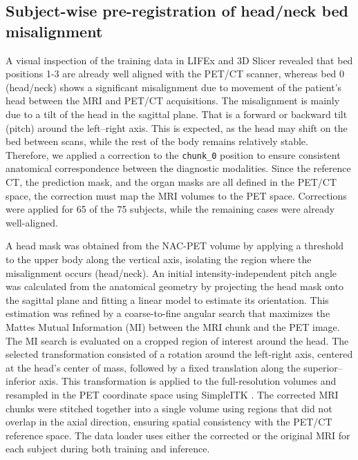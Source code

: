 \documentclass{article}
\begin{document}
\subsection{Subject-wise pre-registration of head/neck bed misalignment}

A visual inspection of the training data in LIFEx \cite{nioche2018lifex} and 3D Slicer \cite{fedorov20123d} revealed that bed positions 1-3 are already well aligned with the PET/CT scanner, whereas bed 0 (head/neck) shows a significant misalignment due to movement of the patient's head between the MRI and PET/CT acquisitions. 
The misalignment is mainly due to a tilt of the head in the sagittal plane. That is a forward or backward tilt (pitch) around the left–right axis. This is expected, as the head may shift on the bed between scans, while the rest of the body remains relatively stable.
Therefore, we applied a correction to the \texttt{chunk\_0} position to ensure consistent anatomical correspondence between the diagnostic modalities.
Since the reference CT, the prediction mask, and the organ masks are all defined in the PET/CT space, the correction must map the MRI volumes to the PET space. 
Corrections were applied for 65 of the 75 subjects, while the remaining cases were already well-aligned. 

A head mask was obtained from the NAC-PET volume by applying a threshold to the upper body along the vertical axis, isolating the region where the misalignment occurs (head/neck). An initial intensity-independent pitch angle was calculated from the anatomical geometry by projecting the head mask onto the sagittal plane and fitting a linear model to estimate its orientation.
This estimation was refined by a coarse-to-fine angular search that maximizes the Mattes Mutual Information (MI) \cite{maes2003medical} between the MRI chunk and the PET image. 
The MI search is evaluated on a cropped region of interest around the head. The selected transformation consisted of a rotation around the left-right axis, centered at the head's center of mass, followed by a fixed translation along the superior–inferior axis. This transformation is applied to the full-resolution volumes and resampled in the PET coordinate space using SimpleITK \cite{lowekamp2013design}. 
The corrected MRI chunks were stitched together into a single volume using regions that did not overlap in the axial direction, ensuring spatial consistency with the PET/CT reference space. The data loader uses either the corrected or the original MRI for each subject during both training and inference.
\end{document}
